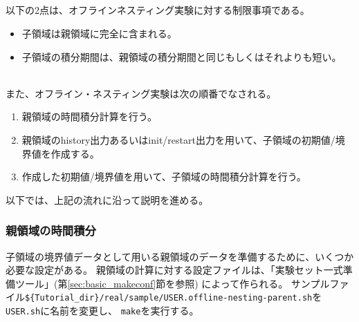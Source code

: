 \subsection{\SubsecOflineNesting} \label{subsec:nest_offline}

以下の2点は、オフラインネスティング実験に対する制限事項である。
\begin{itemize}
 \item 子領域は親領域に完全に含まれる。
 \item 子領域の積分期間は、親領域の積分期間と同じもしくはそれよりも短い。
\end{itemize}

~\\
また、オフライン・ネスティング実験は次の順番でなされる。
\begin{enumerate}
 \item 親領域の時間積分計算を行う。
 \item 親領域のhistory出力あるいはinit/restart出力を用いて、子領域の初期値/境界値を作成する。
 \item 作成した初期値/境界値を用いて、子領域の時間積分計算を行う。
\end{enumerate}
以下では、上記の流れに沿って説明を進める。


\subsubsection{親領域の時間積分}
子領域の境界値データとして用いる親領域のデータを準備するために、いくつか必要な設定がある。
親領域の計算に対する設定ファイルは、「実験セット一式準備ツール」(第\ref{sec:basic_makeconf}節を参照)
によって作られる。
サンプルファイル\verb|${Tutorial_dir}/real/sample/USER.offline-nesting-parent.sh|を 
\verb|USER.sh|に名前を変更し、 \verb|make|を実行する。

